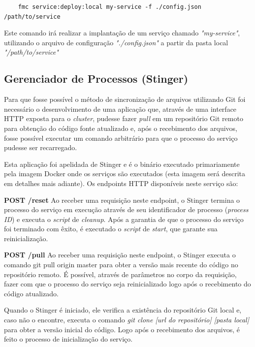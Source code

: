 \documentclass[]{politex}
\begin{document}
	\begin{verbatim}
	fmc service:deploy:local my-service -f ./config.json /path/to/service
	\end{verbatim}

	Este comando irá realizar a implantação de um serviço chamado \textit{"my-service"}, utilizando o arquivo de configuração \textit{"./config.json"} a partir da pasta local \textit{"/path/to/service"}

	\subsection{Gerenciador de Processos (Stinger)}	
	
	Para que fosse possível o método de sincronização de arquivos utilizando Git foi necessário o desenvolvimento de uma aplicação que, através de uma interface HTTP exposta para o \textit{cluster}, pudesse fazer \textit{pull} em um repositório Git remoto para obtenção do código fonte atualizado e, após o recebimento dos arquivos, fosse possível executar um comando arbitrário para que o processo do serviço pudesse ser recarregado.
	
	Esta aplicação foi apelidada de Stinger e é o binário executado primariamente pela imagem Docker onde os serviços são executados (esta imagem será descrita em detalhes mais adiante). Os endpoints HTTP disponíveis neste serviço são:

    \textbf{POST /reset}
	\newline
	Ao receber uma requisição neste endpoint, o Stinger termina o processo do serviço em execução através de seu identificador de processo (\textit{process ID}) e executa o \textit{script} de \textit{cleanup}. Após a garantia de que o processo do serviço foi terminado com êxito, é executado o \textit{script} de \textit{start}, que garante sua reinicialização.
	
	\textbf{POST /pull}
	\newline
	Ao receber uma requisição neste endpoint, o Stinger executa o comando git pull origin master para obter a versão mais recente do código no repositório remoto. É possível, através de parâmetros no corpo da requisição, fazer com que o processo do serviço seja reinicializado logo após o recebimento do código atualizado.

	Quando o Stinger é iniciado, ele verifica a existência do repositório Git local e, caso não o encontre, executa o comando \textit{git clone [url do repositório] [pasta local]} para obter a versão inicial do código. Logo após o recebimento dos arquivos, é feito o processo de inicialização do serviço.
\end{document}
